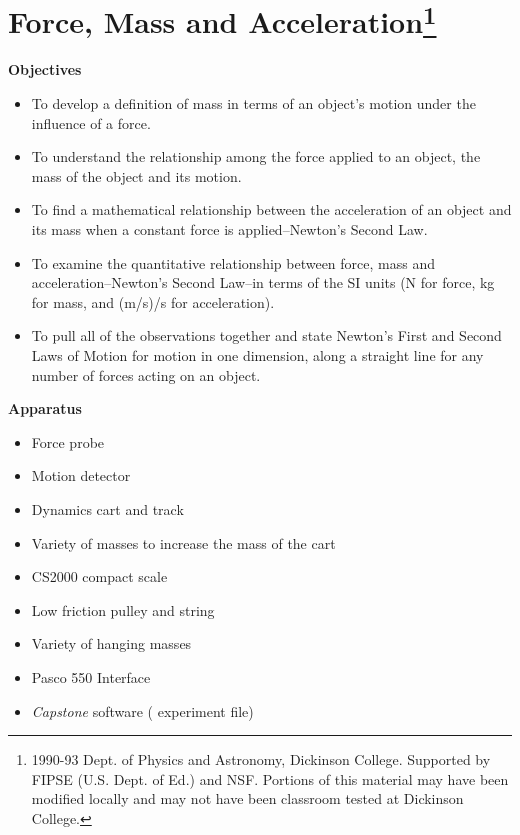 
\section{Force, Mass and Acceleration\footnote{
1990-93 Dept. of Physics and Astronomy, Dickinson College. Supported by FIPSE
(U.S. Dept. of Ed.) and NSF. Portions of this material may have been modified
locally and may not have been classroom tested at Dickinson College.
}}
\makelabheader %

\bigskip
\textbf{Objectives }

\begin{itemize}
\item To develop a definition of mass in terms of an object's motion under the influence
of a force. 
\item To understand the relationship among the force applied to an object, the mass
of the object and its motion. 
\item To find a mathematical relationship between the acceleration of an object and
its mass when a constant force is applied--Newton's Second Law. 
\item To examine the quantitative relationship between force, mass and acceleration--Newton's
Second Law--in terms of the SI units (N for force, kg for mass, and (m/s)/s for
acceleration). 
\item To pull all of the observations together and state Newton's First and Second
Laws of Motion for motion in one dimension, along a straight line for any number
of forces acting on an object.
\end{itemize}

\bigskip
\textbf{Apparatus }

\begin{itemize}
\item Force probe 
\item Motion detector 
\item Dynamics cart and track 
\item Variety of masses to increase the mass of the cart 
\item CS2000 compact scale
\item Low friction pulley and string 
\item Variety of hanging masses 
\item Pasco 550 Interface
\item \textit{Capstone} software ( experiment file)
\end{itemize}

